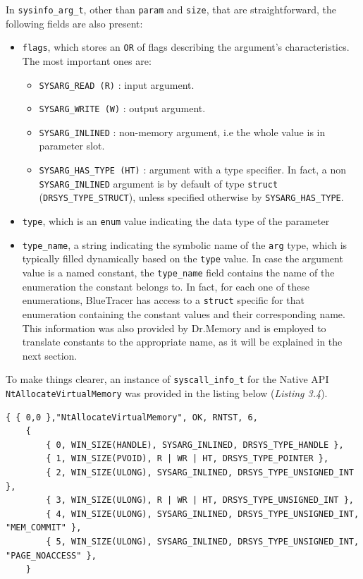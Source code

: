 In \texttt{sysinfo\_arg\_t}, other than \texttt{param} and \texttt{size}, that are straightforward, the following fields are also present:
\begin{itemize}
\item \texttt{flags}, which stores an \texttt{OR} of flags describing the argument's characteristics. The most important ones are:

\begin{itemize}
\item \texttt{SYSARG\_READ (R)} : input argument. 
\item \texttt{SYSARG\_WRITE (W)} : output argument.
\item \texttt{SYSARG\_INLINED} : non-memory argument, i.e the whole value is in parameter slot.
\item \texttt{SYSARG\_HAS\_TYPE (HT)} : argument with a type specifier. In fact, a non \texttt{SYSARG\_INLINED} argument is by default of type \texttt{struct} (\texttt{DRSYS\_TYPE\_STRUCT}), unless specified otherwise by \texttt{SYSARG\_HAS\_TYPE}. 
\end{itemize}

\item \texttt{type}, which is an \texttt{enum} value indicating the data type of the parameter

\item \texttt{type\_name}, a string indicating the symbolic name of the \texttt{arg} type, which is typically filled dynamically based on the \texttt{type} value. In case the argument value is a named constant, the \texttt{type\_name} field contains the name of the enumeration the constant belongs to. In fact, for each one of these enumerations, BlueTracer has access to a \texttt{struct} specific for that enumeration containing the constant values and their corresponding name. This information was also provided by Dr.Memory and is employed to translate constants to the appropriate name, as it will be explained in the next section. 

\end{itemize}

To make things clearer, an instance of \texttt{syscall\_info\_t} for the Native API \texttt{NtAllocateVirtualMemory} was provided in the listing below (\textit{Listing 3.4}).
\\
\begin{lstlisting}[caption={Instance of \texttt{syscall\_info\_t} relative to \texttt{NtAllocateVirtualMemory}},captionpos=b]
	{ { 0,0 },"NtAllocateVirtualMemory", OK, RNTST, 6,
	{
		{ 0, WIN_SIZE(HANDLE), SYSARG_INLINED, DRSYS_TYPE_HANDLE },
		{ 1, WIN_SIZE(PVOID), R | WR | HT, DRSYS_TYPE_POINTER },
		{ 2, WIN_SIZE(ULONG), SYSARG_INLINED, DRSYS_TYPE_UNSIGNED_INT },
		{ 3, WIN_SIZE(ULONG), R | WR | HT, DRSYS_TYPE_UNSIGNED_INT },
		{ 4, WIN_SIZE(ULONG), SYSARG_INLINED, DRSYS_TYPE_UNSIGNED_INT, "MEM_COMMIT" },
		{ 5, WIN_SIZE(ULONG), SYSARG_INLINED, DRSYS_TYPE_UNSIGNED_INT, "PAGE_NOACCESS" },
	}
\end{lstlisting}

